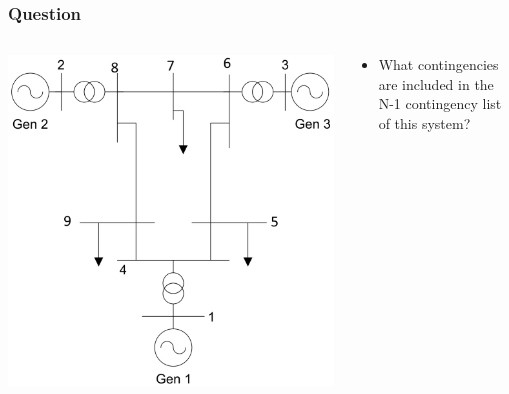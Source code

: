\documentclass[compress]{beamer}
\begin{document}
\begin{frame}
  \frametitle{Question}
  \begin{columns}
    \begin{column}{0.5\textwidth}
    \includegraphics[width=\textwidth]{Figs/ieee9.png}\\  
    \end{column}
    \begin{column}{0.5\textwidth}
\begin{itemize}
\item What contingencies are included in the N-1 contingency list of this system?
\end{itemize}      
    \end{column}
  \end{columns}
\end{frame}
\end{document}
